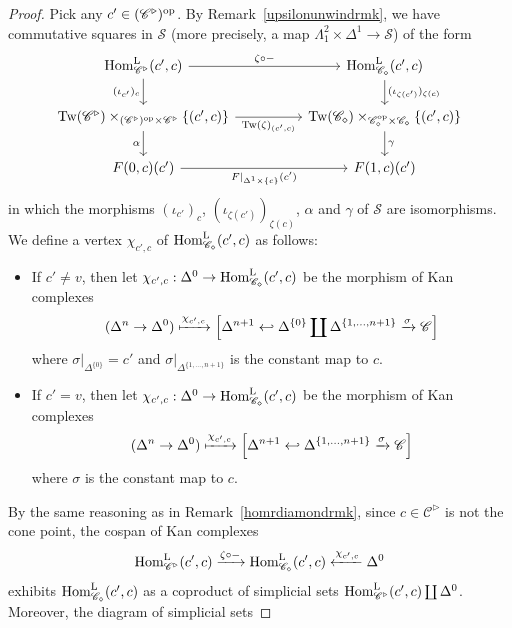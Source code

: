 \documentclass{tac}
\newcommand{\s}[1]{\mathscr{#1}}
\newcommand{\tx}[1]{\textnormal{#1}}
\begin{document}
\begin{proof}
Pick any $c' \in (\s{C}^\triangleright )^\tx{op}$. By Remark~\ref{upsilonunwindrmk}, we have commutative squares in $\s{S}$ (more precisely, a map $\Lambda^2_1 \times \Delta^1 \to \s{S}$) of the form
\[\begin{tikzcd}
\tx{Hom}_{\s{C}^\triangleright }^\tx{L} (c',c) \arrow[]{rr}{\zeta \circ -} \arrow[]{d}[swap]{(\iota_{c'})_{c}} & & \tx{Hom}_{\s{C}_\diamond }^\tx{L} (c',c) \arrow[]{d}{(\iota_{\zeta(c')})_{\zeta (c)}} \\
 \tx{Tw}(\s{C}^\triangleright )\times_{(\s{C}^\triangleright )^\tx{op} \times \s{C}^\triangleright } \{ (c',c) \} \arrow[]{rr}[swap]{\tx{Tw}(\zeta )_{(c',c)}} \arrow[]{d}[swap]{\alpha} & & \tx{Tw}(\s{C}_\diamond )\times_{\s{C}_\diamond^\tx{op} \times \s{C}_\diamond } \{ (c',c) \} \arrow[]{d}{\gamma} \\
F(0,c)(c') \arrow[]{rr}[swap]{F|_{\Delta^1 \times \{c\}} (c') } & & F(1,c)(c')
\end{tikzcd}\]
in which the morphisms $(\iota_{c'})_{c}$, $(\iota_{\zeta(c')})_{\zeta (c)}$, $\alpha$ and $\gamma$ of $\s{S}$ are isomorphisms. 
We define a vertex $\chi_{c',c}$ of $\tx{Hom}_{\s{C}_\diamond }^\tx{L} (c',c)$ as follows: 
\begin{itemize}
\item If $c' \neq v$, then let $\chi_{c',c} : \Delta^0 \to \tx{Hom}_{\s{C}_\diamond }^\tx{L} (c',c)$ be the morphism of Kan complexes
\[ (\Delta^n \to \Delta^0 ) \xmapsto{\chi_{c',c}} 
\left[ \Delta^{n+1} \hookleftarrow \Delta^{\{0 \}} \coprod \Delta^{\{1, \dots , n+1 \}} \xrightarrow{\sigma} \s{C} \right]  \]
where $\sigma|_{\Delta^{\{0\}}} = c'$ and $\sigma|_{\Delta^{\{1, \dots , n+1 \}}}$ is the constant map to $c$.  
\item If $c' = v$, then let $\chi_{c',c} : \Delta^0 \to \tx{Hom}_{\s{C}_\diamond }^\tx{L} (c',c)$ be the morphism of Kan complexes
\[ (\Delta^n \to \Delta^0 ) \xmapsto{\chi_{c',c}} 
\left[ \Delta^{n+1} \hookleftarrow  \Delta^{\{1, \dots , n+1 \}} \xrightarrow{\sigma} \s{C} \right]  \]
where $\sigma$ is the constant map to $c$.  
\end{itemize}
By the same reasoning as in Remark~\ref{homrdiamondrmk}, since $c \in \s{C}^\triangleright $ is not the cone point, the cospan of Kan complexes
\[  \tx{Hom}_{\s{C}^\triangleright }^\tx{L} (c',c) \xrightarrow{\zeta\circ -} \tx{Hom}_{\s{C}_\diamond }^\tx{L} (c',c) \xleftarrow{\chi_{c',c}} \Delta^0 \]
exhibits $\tx{Hom}_{\s{C}_\diamond }^\tx{L} (c',c)$ as a coproduct of simplicial sets $\tx{Hom}_{\s{C}^\triangleright }^\tx{L} (c',c) \coprod \Delta^0$.  Moreover, the diagram of simplicial sets

\end{proof}
\end{document}
